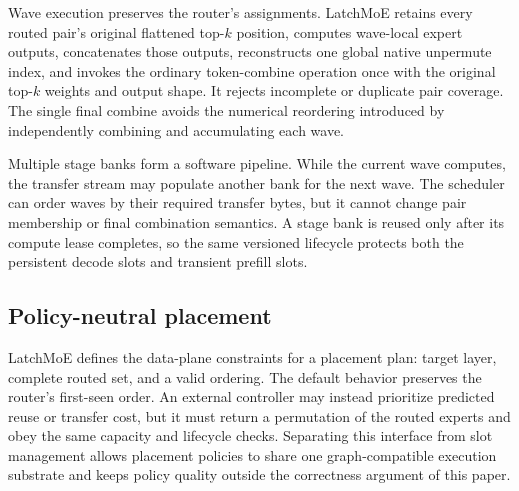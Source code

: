 Wave execution preserves the router's assignments. LatchMoE retains every
routed pair's original flattened top-$k$ position, computes wave-local expert
outputs, concatenates those outputs, reconstructs one global native unpermute
index, and invokes the ordinary token-combine operation once with the original
top-$k$ weights and output shape. It rejects incomplete or duplicate pair
coverage. The single final combine avoids the numerical reordering introduced
by independently combining and accumulating each wave.

Multiple stage banks form a software pipeline. While the current wave computes,
the transfer stream may populate another bank for the next wave. The scheduler
can order waves by their required transfer bytes, but it cannot change pair
membership or final combination semantics. A stage bank is reused only after
its compute lease completes, so the same versioned lifecycle protects both the
persistent decode slots and transient prefill slots.

\subsection{Policy-neutral placement}
\label{sec:policy-neutral}

LatchMoE defines the data-plane constraints for a placement plan: target layer,
complete routed set, and a valid ordering. The default behavior preserves the
router's first-seen order. An external controller may instead prioritize
predicted reuse or transfer cost, but it must return a permutation of the
routed experts and obey the same capacity and lifecycle checks. Separating
this interface from slot management allows placement policies to share one
graph-compatible execution substrate and keeps policy quality outside the
correctness argument of this paper.
